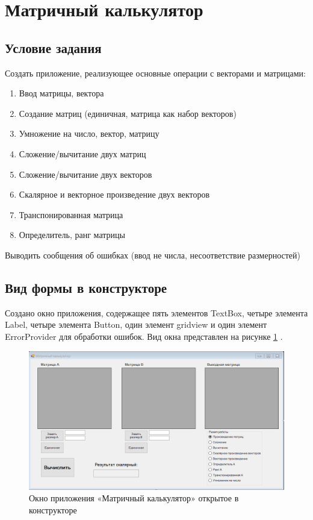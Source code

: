 \section{Матричный калькулятор}

\subsection{Условие задания}

Создать приложение, реализующее основные операции с векторами и матрицами:
\begin{enumerate}
    \item Ввод матрицы, вектора
    \item Создание матриц (единичная, матрица как набор векторов)
    \item Умножение на число, вектор, матрицу
    \item Сложение/вычитание двух матриц
    \item Сложение/вычитание двух векторов
    \item Скалярное и векторное произведение двух векторов
    \item Транспонированная матрица
    \item Определитель, ранг матрицы
\end{enumerate}
Выводить сообщения об ошибках (ввод не числа, несоответствие размерностей)

\subsection{Вид формы в конструкторе}



Создано окно приложения, содержащее пять элементов TextBox, четыре элемента Label, четыре элемента Button, один элемент gridview и один элемент ErrorProvider для обработки ошибок. Вид окна представлен на рисунке \ref{task6_form} \cite{stroustrup2013c++}.
\begin{figure}[H]
    \centering
    \includegraphics[width=1\linewidth]{lections/img/task6_form.png}
    \caption{Окно приложения «Матричный калькулятор» открытое в конструкторе}
    \label{task6_form}
\end{figure}


